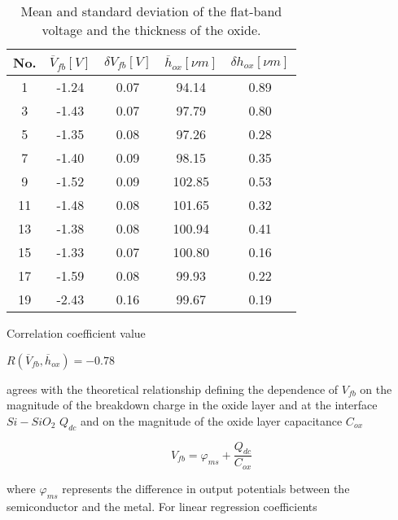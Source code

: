 \begin{table}[h!]\centering
  \begin{minipage}[c]{\myfiguresize}
    \begin{center}
      \begin{tabular}{c c c c c}
        No. & $\overline V_{fb} [V]$ & $\delta V_{fb} [V]$ & $\overline h_{ox} [\nu{m}]$ & $\delta h_{ox} [\nu{m}]$\\
        \hline
        1 & -1.24 & 0.07 & 94.14 & 0.89\\
        3 & -1.43 & 0.07 & 97.79 & 0.80\\
        5 & -1.35 & 0.08 & 97.26 & 0.28\\
        7 & -1.40 & 0.09 & 98.15 & 0.35\\
        9 & -1.52 & 0.09 & 102.85 & 0.53\\
        11 & -1.48 & 0.08 & 101.65 & 0.32\\
        13 & -1.38 & 0.08 & 100.94 & 0.41\\
        15 & -1.33 & 0.07 & 100.80 & 0.16\\
        17 & -1.59 & 0.08 & 99.93 & 0.22\\
        19 & -2.43 & 0.16 & 99.67 & 0.19\\
      \end{tabular}
    \end{center}
    \caption[Mean and standard deviation of the flat-band voltage and
      the thickness of the oxide]{Mean and standard deviation of the
      flat-band voltage and the thickness of the
      oxide.}\label{tab:7.4}
  \end{minipage}
\end{table}

Correlation coefficient value

\centerline{$R(\overline V_{fb} ,\overline h_{ox}) = -0.78$}

agrees with the theoretical relationship defining the dependence of
$V_{fb}$ on the magnitude of the breakdown charge in the oxide layer
and at the interface $Si-SiO_{2}$ $Q_{dc}$ and on the magnitude of the
oxide layer capacitance $C_{ox}$

\begin{equation}\label{eq:7.3}
  V_{fb}  = \varphi_{ms} + \frac{Q_{dc}}{C_{ox}}
\end{equation}

where $\varphi_{ms}$ represents the difference in output potentials
between the semiconductor and the metal. For linear regression
coefficients

